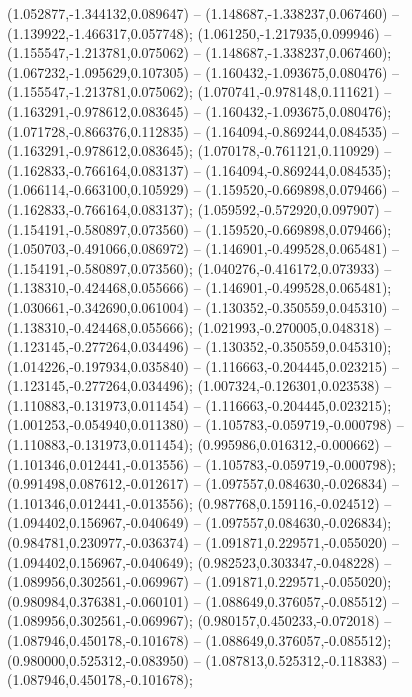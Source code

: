  (1.052877,-1.344132,0.089647) -- (1.148687,-1.338237,0.067460) -- (1.139922,-1.466317,0.057748);
 (1.061250,-1.217935,0.099946) -- (1.155547,-1.213781,0.075062) -- (1.148687,-1.338237,0.067460);
 (1.067232,-1.095629,0.107305) -- (1.160432,-1.093675,0.080476) -- (1.155547,-1.213781,0.075062);
 (1.070741,-0.978148,0.111621) -- (1.163291,-0.978612,0.083645) -- (1.160432,-1.093675,0.080476);
 (1.071728,-0.866376,0.112835) -- (1.164094,-0.869244,0.084535) -- (1.163291,-0.978612,0.083645);
 (1.070178,-0.761121,0.110929) -- (1.162833,-0.766164,0.083137) -- (1.164094,-0.869244,0.084535);
 (1.066114,-0.663100,0.105929) -- (1.159520,-0.669898,0.079466) -- (1.162833,-0.766164,0.083137);
 (1.059592,-0.572920,0.097907) -- (1.154191,-0.580897,0.073560) -- (1.159520,-0.669898,0.079466);
 (1.050703,-0.491066,0.086972) -- (1.146901,-0.499528,0.065481) -- (1.154191,-0.580897,0.073560);
 (1.040276,-0.416172,0.073933) -- (1.138310,-0.424468,0.055666) -- (1.146901,-0.499528,0.065481);
 (1.030661,-0.342690,0.061004) -- (1.130352,-0.350559,0.045310) -- (1.138310,-0.424468,0.055666);
 (1.021993,-0.270005,0.048318) -- (1.123145,-0.277264,0.034496) -- (1.130352,-0.350559,0.045310);
 (1.014226,-0.197934,0.035840) -- (1.116663,-0.204445,0.023215) -- (1.123145,-0.277264,0.034496);
 (1.007324,-0.126301,0.023538) -- (1.110883,-0.131973,0.011454) -- (1.116663,-0.204445,0.023215);
 (1.001253,-0.054940,0.011380) -- (1.105783,-0.059719,-0.000798) -- (1.110883,-0.131973,0.011454);
 (0.995986,0.016312,-0.000662) -- (1.101346,0.012441,-0.013556) -- (1.105783,-0.059719,-0.000798);
 (0.991498,0.087612,-0.012617) -- (1.097557,0.084630,-0.026834) -- (1.101346,0.012441,-0.013556);
 (0.987768,0.159116,-0.024512) -- (1.094402,0.156967,-0.040649) -- (1.097557,0.084630,-0.026834);
 (0.984781,0.230977,-0.036374) -- (1.091871,0.229571,-0.055020) -- (1.094402,0.156967,-0.040649);
 (0.982523,0.303347,-0.048228) -- (1.089956,0.302561,-0.069967) -- (1.091871,0.229571,-0.055020);
 (0.980984,0.376381,-0.060101) -- (1.088649,0.376057,-0.085512) -- (1.089956,0.302561,-0.069967);
 (0.980157,0.450233,-0.072018) -- (1.087946,0.450178,-0.101678) -- (1.088649,0.376057,-0.085512);
 (0.980000,0.525312,-0.083950) -- (1.087813,0.525312,-0.118383) -- (1.087946,0.450178,-0.101678);

